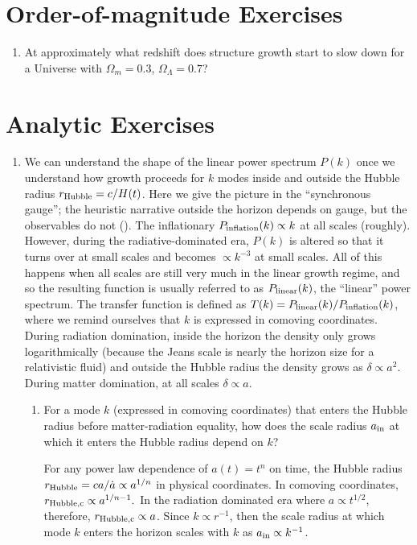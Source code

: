 \section{Order-of-magnitude Exercises}

\begin{enumerate} 
\item At approximately what redshift does structure growth start to
    slow down for a Universe with $\Omega_m = 0.3$, $\Omega_\Lambda = 0.7$?
\end{enumerate} 

\section{Analytic Exercises}

\begin{enumerate}
\item We can understand the shape of the linear power spectrum $P(k)$
once we understand how growth proceeds for $k$ modes inside and
outside the Hubble radius $r_{\rm Hubble} = c/H(t)$. Here we give the
picture in the ``synchronous gauge''; the heuristic narrative outside
the horizon depends on gauge, but the observables do not
(\citealt{ma95a}). The inflationary $P_{\rm inflation}(k)\propto k$ at
all scales (roughly). However, during the radiative-dominated era,
$P(k)$ is altered so that it turns over at small scales and becomes
$\propto k^{-3}$ at small scales. All of this happens when all scales
are still very much in the linear growth regime, and so the resulting
function is usually referred to as $P_{\rm linear}(k)$, the ``linear''
power spectrum.  The transfer function is defined as $T(k) = P_{\rm
linear}(k) / P_{\rm inflation}(k)$, where we remind ourselves that $k$
is expressed in comoving coordinates. During radiation domination,
inside the horizon the density only grows logarithmically (because the
Jeans scale is nearly the horizon size for a relativistic fluid) and
outside the Hubble radius the density grows as $\delta\propto
a^2$. During matter domination, at all scales $\delta\propto a$.
\begin{enumerate}
\item For a mode $k$ (expressed in comoving coordinates) that
enters the Hubble radius before matter-radiation equality, how does
the scale radius $a_{\rm in}$ at which it enters the Hubble radius
depend on $k$?

\begin{answer}
For any power law dependence of $a(t)= t^n$ on time, the Hubble radius
$r_{\rm Hubble} = c a/{\dot a} \propto a^{1/n}$ in physical
coordinates. In comoving coordinates, $r_{\rm Hubble, c} \propto
a^{1/n-1}.$ In the radiation dominated era where $a\propto t^{1/2}$,
therefore, $r_{\rm Hubble,c} \propto a$. Since $k \propto r^{-1}$,
then the scale radius at which mode $k$ enters the horizon scales with
$k$ as $a_{\rm in} \propto k^{-1}$.
\end{answer}


\end{enumerate}
\end{enumerate}
